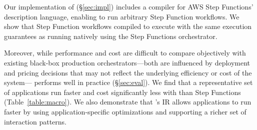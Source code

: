 Our implementation of \name{} (\S\ref{sec:impl}) includes a compiler for AWS
Step Functions' description language, enabling \name{} to run arbitrary Step
Function workflows. We show that Step Function workflows compiled to \name{}
execute with the same execution guarantees as running natively using the Step
Functions orchestrator.

Moreover, while performance and cost are difficult to compare
 objectively with existing black-box production orchestrators---both are
 influenced by deployment and pricing decisions that may not reflect the
 underlying efficiency or cost of the system---\name{} performs well in
 practice (\S\ref {sec:eval}). We find that a representative set of
 applications run faster and cost significantly less with \name{} than Step
 Functions (Table~\ref {table:macro}). We also demonstrate that \name{}'s IR
 allows applications to run faster by using application-specific optimizations
 and supporting a richer set of interaction patterns.
